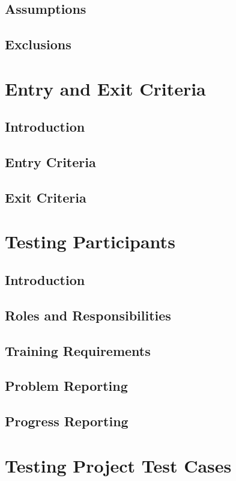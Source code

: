 \documentclass{article}
\begin{document}
\begin{itemize}
\subsection{Assumptions}
\subsection{Exclusions}

\section{Entry and Exit Criteria} %

\subsection{Introduction}
\subsection{Entry Criteria}
\subsection{Exit Criteria}

\section{Testing Participants} %


\subsection{Introduction}
\subsection{Roles and Responsibilities}
\subsection{Training Requirements}
\subsection{Problem Reporting}
\subsection{Progress Reporting}

\section{Testing Project Test Cases}


\end{itemize}
\end{document}

